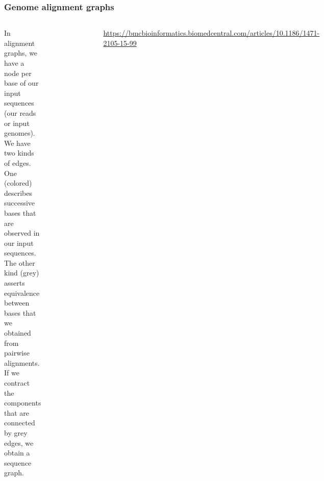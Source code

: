 \documentclass[aspectratio=169]{beamer}
\begin{document}

\begin{frame}
  \frametitle{Genome alignment graphs}

  \begin{columns}[c] %
    {\small 
  In alignment graphs, we have a node per base of our input sequences (our reads or input genomes).
  We have two kinds of edges.
  One (colored) describes successive bases that are observed in our input sequences.
  The other kind (grey) asserts equivalence between bases that we obtained from pairwise alignments.
  If we contract the components that are connected by grey edges, we obtain a sequence graph.
}
\begin{figure}
  \includegraphics[scale=0.7,center]{alignmentgraph.png}
\end{figure}

{\footnotesize \url{https://bmcbioinformatics.biomedcentral.com/articles/10.1186/1471-2105-15-99}}

\end{columns}



\end{frame}
\end{document}
